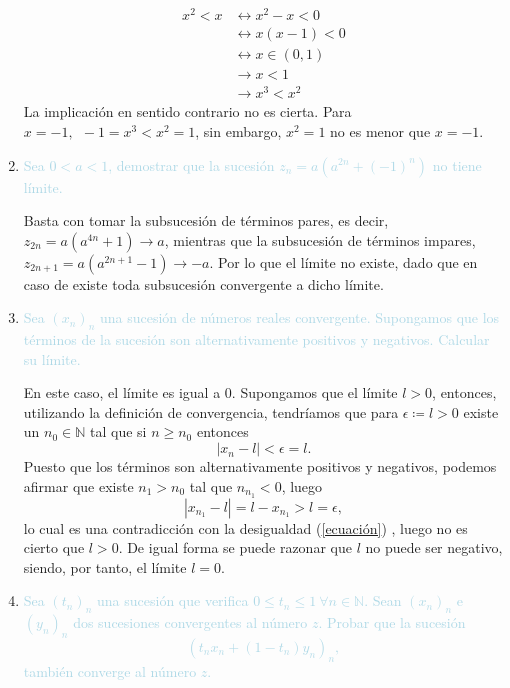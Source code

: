 \begin{enumerate}[label=\color{red}\textbf{\arabic*)}, leftmargin=*]
	\[ \begin{aligned}
		x^2<x & \longleftrightarrow  x^2-x<0\\
		 & \longleftrightarrow x(x-1)<0\\
		 & \longleftrightarrow x\in(0,1)\\
		 & \longrightarrow x<1\\
		 & \longrightarrow x^3<x^2 
	\end{aligned} \]
	La implicación en sentido contrario no es cierta. Para $x=-1,~~-1=x^3<x^2=1$, sin embargo, $x^2=1$ no es menor que $x=-1$.
	\item \textcolor{lightblue}{Sea $0<a<1$, demostrar que la sucesión $z_n=a(a^{2n}+(-1)^n)$ no tiene límite.}
	
	Basta con tomar la subsucesión de términos pares, es decir, $z_{2n}=a(a^{4n}+1)\longrightarrow a$, mientras que la subsucesión de términos impares, $z_{2n+1}=a(a^{2n+1}-1)\longrightarrow-a$. Por lo que el límite no existe, dado que en caso de existe toda subsucesión convergente a dicho límite.
	\item \textcolor{lightblue}{Sea $(x_n)_n$ una sucesión de números reales convergente. Supongamos que los términos de la sucesión son alternativamente positivos y negativos. Calcular su límite.}
	
	En este caso, el límite es igual a 0. Supongamos que el límite $l>0$, entonces, utilizando la definición de convergencia, tendríamos que para $\epsilon\coloneq l>0$ existe un $n_0\in\mathbb{N}$ tal que si $n\ge n_0$ entonces \begin{equation}\label{ecuación}
		|x_n-l|<\epsilon=l.
	\end{equation} Puesto que los términos son alternativamente positivos y negativos, podemos afirmar que existe $n_1>n_0$ tal que $n_{n_1}<0$, luego \[ |x_{n_1}-l|=l-x_{n_1}>l=\epsilon, \] lo cual es una contradicción con la desigualdad (\ref{ecuación}) , luego no es cierto que $l>0$. De igual forma se puede razonar que $l$ no puede ser negativo, siendo, por tanto, el límite $l=0$.
	\item \textcolor{lightblue}{Sea $(t_n)_n$ una sucesión que verifica $0\le t_n\le 1~\forall n\in\mathbb{N}$. Sean $(x_n)_n$ e $(y_n)_n$ dos sucesiones convergentes al número $z$. Probar que la sucesión \[ (t_nx_n+(1-t_n)y_n)_n, \] también converge al número $z$.}
	

\end{enumerate}
